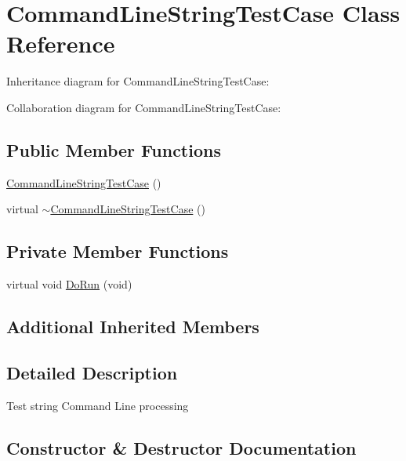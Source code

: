 \hypertarget{classCommandLineStringTestCase}{}\section{Command\+Line\+String\+Test\+Case Class Reference}
\label{classCommandLineStringTestCase}


Inheritance diagram for Command\+Line\+String\+Test\+Case\+:


Collaboration diagram for Command\+Line\+String\+Test\+Case\+:
\subsection*{Public Member Functions}
\begin{DoxyCompactItemize}
\item 
\hyperlink{classCommandLineStringTestCase_ab11a98839a5659cf6ed90932a0e73685}{Command\+Line\+String\+Test\+Case} ()
\item 
virtual \hyperlink{classCommandLineStringTestCase_a7f5dfd9dba2c44c9190d559b4300cf0d}{$\sim$\+Command\+Line\+String\+Test\+Case} ()
\end{DoxyCompactItemize}
\subsection*{Private Member Functions}
\begin{DoxyCompactItemize}
\item 
virtual void \hyperlink{classCommandLineStringTestCase_a1e1884d2d92e33425b28c503f4a495a8}{Do\+Run} (void)
\end{DoxyCompactItemize}
\subsection*{Additional Inherited Members}


\subsection{Detailed Description}
Test string Command Line processing 

\subsection{Constructor \& Destructor Documentation}
